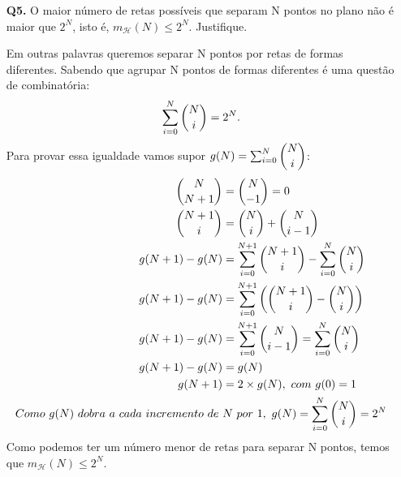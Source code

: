 \documentclass[12pt]{article}
\begin{document}
\begin{enumerate}
\item [\textbf{Q5.}] O maior número de retas possíveis que separam N pontos no plano não é maior que $2^N$, isto é, $m_\mathcal{H}(N) \le 2^N$. Justifique.
	\begin{addmargin}[1em]{2em}%
		Em outras palavras queremos separar N pontos por retas de formas diferentes. Sabendo que agrupar N pontos de formas diferentes é uma questão de combinatória: \[\sum_{i=0}^{N}\dbinom{N}{i} = 2^N.\]
		Para provar essa igualdade vamos supor $g(N) = \sum_{i=0}^{N}\dbinom{N}{i}$:
			\begin{align}
				\dbinom{N}{N+1} &= \dbinom{N}{-1} = 0\\
				\dbinom{N+1}{i} &= \dbinom{N}{i} + \dbinom{N}{i-1}\\
				g(N + 1) - g(N) &= \sum_{i=0}^{N+1}\dbinom{N+1}{i} - \sum_{i=0}^{N}\dbinom{N}{i}\\
				g(N + 1) - g(N) &= \sum_{i=0}^{N+1} \left( \dbinom{N+1}{i} - \dbinom{N}{i} \right)\\
				g(N + 1) - g(N) &= \sum_{i=0}^{N+1} \dbinom{N}{i-1} = \sum_{i=0}^{N}\dbinom{N}{i}\\
				g(N + 1) - g(N) &= g(N)\\
				g(N + 1) &= 2 \times g(N),\ com\ g(0) = 1\\
				Como\ g(N)\ dobra\ a\ cada\ incremento\ de\ &N\ por\ 1,\ g(N) = \sum_{i=0}^{N}\dbinom{N}{i} = 2^N
			\end{align}
			Como podemos ter um número menor de retas para separar N pontos, temos que $m_{\mathcal{H}}(N) \leq 2^N$.
\end{addmargin}

\pagebreak


\end{enumerate}
\end{document}
